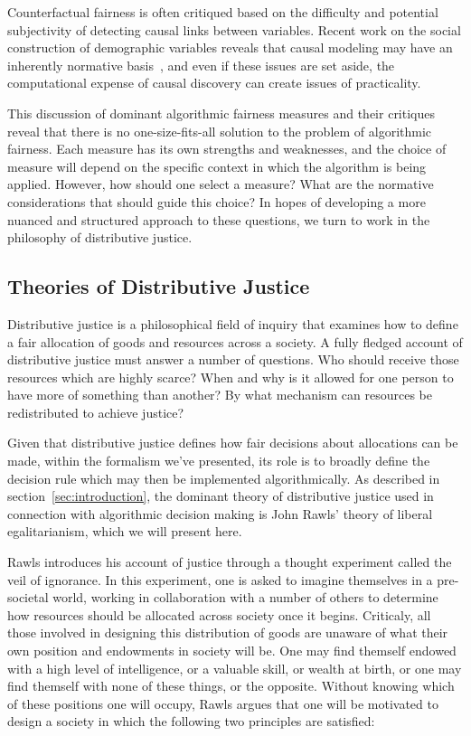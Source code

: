 Counterfactual fairness is often critiqued based on the difficulty and potential
subjectivity of detecting causal links between variables. Recent work on the 
social construction of demographic variables reveals that causal modeling may 
have an inherently normative basis~\citep{Hu_Forthcoming}, and even if these
issues are set aside, the computational expense of causal discovery can create
issues of practicality.

This discussion of dominant algorithmic fairness measures and their critiques
reveal that there is no one-size-fits-all solution to the problem of algorithmic
fairness. Each measure has its own strengths and weaknesses, and the choice of
measure will depend on the specific context in which the algorithm is being
applied. However, how should one select a measure? What are the normative
considerations that should guide this choice? In hopes of developing a more
nuanced and structured approach to these questions, we turn to work in the 
philosophy of distributive justice.

\subsection{Theories of Distributive Justice}

Distributive justice is a philosophical field of inquiry that examines how to
define a fair allocation of goods and resources across a society. A fully
fledged account of distributive justice must answer a number of questions. Who
should receive those resources which are highly scarce? When and why is it 
allowed for one person to have more of something than another? By what mechanism
can resources be redistributed to achieve justice?

Given that distributive justice defines how fair decisions about allocations can
be made, within the formalism we've presented, its role is to broadly define the
decision rule which may then be implemented algorithmically. As described in
section~\ref{sec:introduction}, the dominant theory of distributive justice used
in connection with algorithmic decision making is John Rawls' theory of liberal
egalitarianism, which we will present here.

Rawls introduces his account of justice through a thought experiment called the
veil of ignorance. In this experiment, one is asked to imagine themselves in a
pre-societal world, working in collaboration with a number of others to
determine how resources should be allocated across society once it begins. 
Criticaly, all those involved in designing this distribution of goods are
unaware of what their own position and endowments in society will be. One may
find themself endowed with a high level of intelligence, or a valuable skill, or
wealth at birth, or one may find themself with none of these things, or the
opposite. Without knowing which of these positions one will occupy, Rawls argues
that one will be motivated to design a society in which the following two
principles are satisfied:

